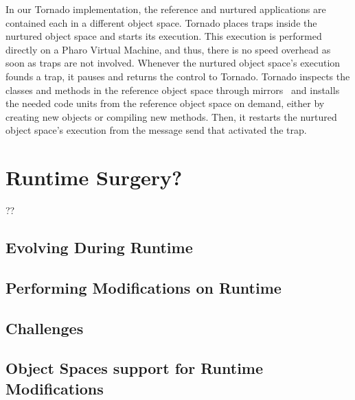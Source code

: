 In our Tornado implementation, the reference and nurtured applications are contained each in a different object space. Tornado places traps inside the nurtured object space and starts its execution. This execution is performed directly on a Pharo Virtual Machine, and thus, there is no speed overhead as soon as traps are not involved. Whenever the nurtured object space's execution founds a trap, it pauses and returns the control to Tornado. Tornado inspects the classes and methods in the reference object space through mirrors~\cite{ShortBrac04b} and installs the needed code units from the reference object space on demand, either by creating new objects or compiling new methods. Then, it restarts the nurtured object space's execution from the message send that activated the trap.

\section{Runtime Surgery?}

??

\subsection{Evolving During Runtime}

\subsection{Performing Modifications on Runtime}

\subsection{Challenges}

\subsection{Object Spaces support for Runtime Modifications}

